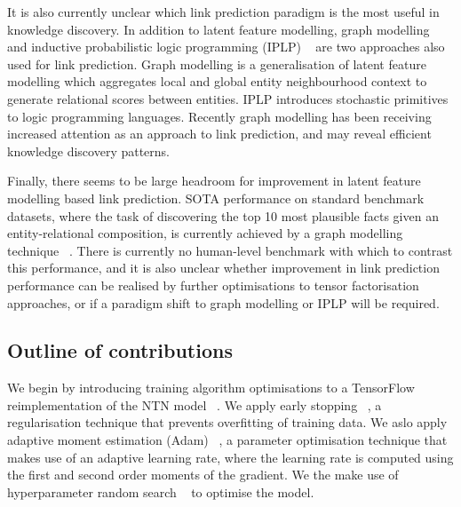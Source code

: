 \noindent It is also currently unclear which link prediction paradigm is the most useful in knowledge discovery. In addition to latent feature modelling, graph modelling \unskip~\citep{niepert2016discriminative, schlichtkrull2018modeling, pinter2018predicting} and inductive probabilistic logic programming (IPLP) \unskip~\citep{speichert2018learning} are two approaches also used for link prediction. Graph modelling is a generalisation of latent feature modelling which aggregates local and global entity neighbourhood context to generate relational scores between entities. IPLP introduces stochastic primitives to logic programming languages. Recently graph modelling has been receiving increased attention as an approach to link prediction, and may reveal efficient knowledge discovery patterns. \par

\noindent Finally, there seems to be large headroom for improvement in latent feature modelling based link prediction. SOTA performance on standard benchmark datasets, where the task of discovering the top 10 most plausible facts given an entity-relational composition, is currently achieved by a graph modelling technique \unskip~\citep{ruderNLPProg}. There is currently no human-level benchmark with which to contrast this performance, and it is also unclear whether improvement in link prediction performance can be realised by further optimisations to tensor factorisation approaches, or if a paradigm shift to graph modelling or IPLP will be required.  

\subsection{Outline of contributions}

We begin by introducing training algorithm optimisations to a TensorFlow \unskip~\citep{abadi2016tensorflow} reimplementation of the NTN model \unskip~\citep{Doss2015}.  We apply early stopping \unskip~\citep{prechelt1998early}, a regularisation technique that prevents overfitting of training data. We aslo apply adaptive moment estimation (Adam)  \unskip~\citep{kingma2014adam}, a parameter optimisation technique that makes use of an adaptive learning rate, where the learning rate is computed using the first and second order moments of the gradient. We the make use of hyperparameter random search \unskip~\citep{bergstra2012random} to optimise the model. \par

